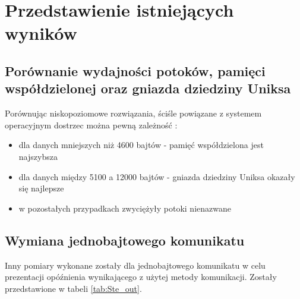 \section{Przedstawienie istniejących wyników}

\subsection{Porównanie wydajności potoków, pamięci współdzielonej oraz gniazda dziedziny Uniksa}

Porównując niskopoziomowe rozwiązania, ściśle powiązane z systemem operacyjnym dostrzec można pewną zależność \cite{ZX2011}:

\begin{itemize}
    \item dla danych mniejszych niż 4600 bajtów - pamięć współdzielona jest najszybsza
    \item dla danych między 5100 a 12000 bajtów - gniazda dziedziny Uniksa okazały się najlepsze
    \item w pozostałych przypadkach zwyciężyły potoki nienazwane
\end{itemize}


\subsection{Wymiana jednobajtowego komunikatu}
 
Inny pomiary wykonane zostały dla jednobajtowego komunikatu w celu prezentacji opóźnienia wynikającego z użytej metody komunikacji. Zostały przedstawione w tabeli \ref{tab:Ste_out}.

